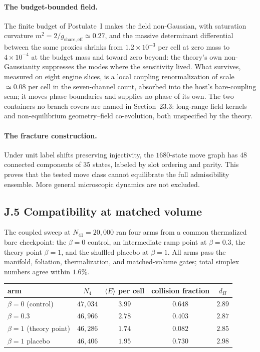 \documentclass[11pt]{article}
\begin{document}
\paragraph{The budget-bounded field.} The finite budget of Postulate~I makes the field non-Gaussian, with saturation curvature $m^2=2/g_{\mathrm{share,eff}}\simeq0.27$, and the massive determinant differential between the same proxies shrinks from $1.2\times10^{-3}$ per cell at zero mass to $4\times10^{-4}$ at the budget mass and toward zero beyond: the theory's own non-Gaussianity suppresses the modes where the sensitivity lived. What survives, measured on eight engine slices, is a local coupling renormalization of scale $\simeq0.08$ per cell in the seven-channel count, absorbed into the host's bare-coupling scan; it moves phase boundaries and supplies no phase of its own. The two containers no branch covers are named in Section~23.3: long-range field kernels and non-equilibrium geometry--field co-evolution, both unspecified by the theory.

\paragraph{The fracture construction.} Under unit label shifts preserving injectivity, the $1680$-state move graph has $48$ connected components of $35$ states, labeled by slot ordering and parity. This proves that the tested move class cannot equilibrate the full admissibility ensemble. More general microscopic dynamics are not excluded.

\subsection*{J.5 Compatibility at matched volume}

The coupled sweep at $N_{41}=20{,}000$ ran four arms from a common thermalized bare checkpoint: the $\beta=0$ control, an intermediate ramp point at $\beta=0.3$, the theory point $\beta=1$, and the shuffled placebo at $\beta=1$. All arms pass the manifold, foliation, thermalization, and matched-volume gates; total simplex numbers agree within $1.6\%$.

\begin{center}
{\small
\begin{tabular}{lcccc}
\hline
arm & $N_4$ & $\langle E\rangle$ per cell & collision fraction & $d_H$ \\
\hline
$\beta=0$ (control) & $47{,}034$ & $3.99$ & $0.648$ & $2.89$ \\
$\beta=0.3$ & $46{,}966$ & $2.78$ & $0.403$ & $2.87$ \\
$\beta=1$ (theory point) & $46{,}286$ & $1.74$ & $0.082$ & $2.85$ \\
$\beta=1$ placebo & $46{,}406$ & $1.95$ & $0.730$ & $2.98$ \\
\hline
\end{tabular}
}
\end{center}
\end{document}
